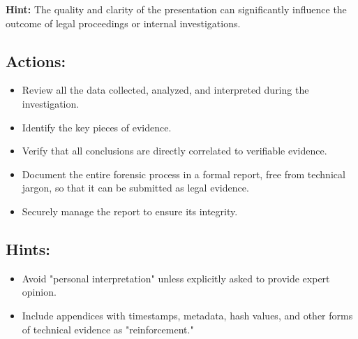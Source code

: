 \textbf{Hint:} The quality and clarity of the presentation can significantly influence the outcome of legal proceedings or internal investigations.

\subsection*{Actions:}
\begin{itemize}[itemsep=0pt]
  \item Review all the data collected, analyzed, and interpreted during the investigation.
  \item Identify the key pieces of evidence.
  \item Verify that all conclusions are directly correlated to verifiable evidence.
  \item Document the entire forensic process in a formal report, free from technical jargon, so that it can be submitted as legal evidence.
  \item Securely manage the report to ensure its integrity.
\end{itemize}

\subsection*{Hints:}
\begin{itemize}[itemsep=0pt]
  \item Avoid "personal interpretation" unless explicitly asked to provide expert opinion.
  \item Include appendices with timestamps, metadata, hash values, and other forms of technical evidence as "reinforcement."
\end{itemize}
